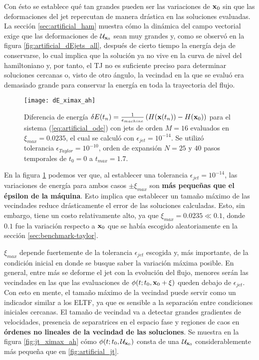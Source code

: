 Con ésto se establece qué tan grandes pueden ser las variaciones de $\mathbf{x}_0$ sin que las deformaciones del jet repercutan de manera drástica en las soluciones evaluadas. La sección \ref{sec:artificial_ham} muestra cómo la dinámica del campo vectorial exige que las deformaciones de $\mathcal{U}_{\mathbf{x}_0}$ sean muy grandes y, como se observó en la figura \ref{fig:artificial_dEjets_all}, después de cierto tiempo la energía deja de conservarse, lo cual implica que la solución ya no vive en la curva de nivel del hamiltoniano y, por tanto, el TJ no es suficiente preciso para determinar soluciones cercanas o, visto de otro ángulo, la vecindad en la que se evaluó era demasiado grande para conservar la energía en toda la trayectoria del flujo.

\begin{figure}[h!]
	\centering
	\texttt{[image: dE\_ximax\_ah]}
	\caption{Diferencia de energía $\delta E(t_n) = \frac{1}{\epsilon_{machine}} \left( H(\mathbf{x}(t_n)) - H(\mathbf{x}_0) \right)$ para el sistema (\ref{eq:artificial_ode}) con jets de orden $M=16$ evaluados en $\xi_{max} = 0.0235$, el cual se calculó con $\epsilon_{jet} = 10^{-14}$. Se utilizó tolerancia $\epsilon_{Taylor} = 10^{-10}$, orden de expansión $N = 25$ y $40$ pasos temporales de $t_0 = 0$ a $t_{max} = 1.7$.}
	\label{fig:dE_ximax_ah}
\end{figure}

En la figura \ref{fig:dE_ximax_ah} podemos ver que, al establecer una tolerancia $\epsilon_{jet} = 10^{-14}$, las variaciones de energía para ambos casos $\pm \xi_{max}$ son \textbf{más pequeñas que el épsilon de la máquina}. Esto implica que establecer un tamaño máximo de las vecindades reduce drásticamente el error de las soluciones calculadas. Esto, sin embargo, tiene un costo relativamente alto, ya que $\xi_{max} = 0.0235 \ll 0.1$, donde $0.1$ fue la variación respecto a $\mathbf{x}_0$ que se había escogido aleatoriamente en la sección \ref{sec:benchmark-taylor}. 

$\xi_{max}$ depende fuertemente de la tolerancia $\epsilon_{jet}$ escogida y, más importante, de la condición inicial en donde se busque saber la variación máxima posible. En general, entre más se deforme el jet con la evolución del flujo, menores serán las vecindades en las que las evaluaciones de $\phi(t;t_0,\mathbf{x}_0 + \xi)$ queden debajo de $\epsilon_{jet}$. Con esto en mente, el tamaño máximo de la vecindad puede servir como un indicador similar a los ELTF, ya que es sensible a la separación entre condiciones iniciales cercanas. El tamaño de vecindad va a detectar grandes gradientes de velocidades, presencia de separatrices en el espacio fase y regiones de caos en \textbf{órdenes no lineales de la vecindad de las soluciones}. Se muestra en la figura \ref{fig:jt_ximax_ah} cómo $\phi(t;t_0,\mathcal{U}_{\mathbf{x}_0} )$ consta de una $\mathcal{U}_{\mathbf{x}_0}$ considerablemente más pequeña que en \ref{fig:artificial_jt}.

